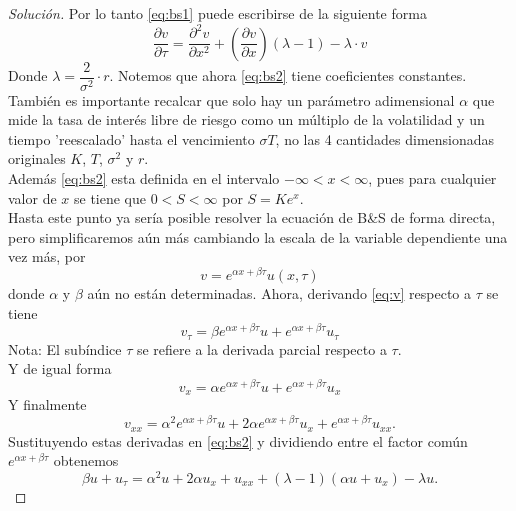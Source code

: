 \documentclass[11pt,notitlepage]{article}
\newenvironment{solucion}
  {\begin{proof}[Solución]}
  {\end{proof}}
\begin{document}
\begin{solucion}
    Por lo tanto \eqref{eq:bs1} puede escribirse de la siguiente forma
    \begin{equation}
        \label{eq:bs2}
        \frac{\partial v}{\partial \tau} = \frac{\partial^2 v}{\partial x^2} + \left(\frac{\partial v}{\partial x}\right) (\lambda - 1) - \lambda \cdot v
    \end{equation}
    Donde $\lambda = \dfrac{2}{\sigma^2} \cdot r$.
    Notemos que ahora \eqref{eq:bs2} tiene coeficientes constantes.
    También es importante recalcar que solo hay un parámetro adimensional $\alpha$ que mide la tasa de interés libre de riesgo como un múltiplo de la volatilidad y un tiempo 'reescalado' hasta el vencimiento $\sigma T$, no las 4 cantidades dimensionadas originales $K$, $T$, $\sigma ^2$ y $r$.\\
    Además \eqref{eq:bs2} esta definida en el intervalo $ -\infty < x < \infty$, pues para cualquier valor de $x$ se tiene que $ 0 < S < \infty$ por $ S = Ke^x $.\\
    Hasta este punto ya sería posible resolver la ecuación de B\&S de forma directa, pero simplificaremos aún más cambiando la escala de la variable dependiente una vez más, por
    \begin{equation}
        \label{eq:v}
        v = e^{\alpha x + \beta \tau} u(x,\tau)
    \end{equation}
    donde $\alpha$ y $\beta$ aún no están determinadas. Ahora, derivando \eqref{eq:v} respecto a $\tau$ se tiene
    \begin{equation}
        \label{eq:dvt}
        v_\tau = \beta e^{\alpha x + \beta \tau} u + e^{\alpha x + \beta \tau} u_\tau
    \end{equation}
    {Nota:} El subíndice $\tau$ se refiere a la derivada parcial respecto a $\tau$.\\
    Y de igual forma
    \begin{equation}
        \label{eq:dvx}
        v_x = \alpha e^{\alpha x + \beta \tau} u + e^{\alpha x + \beta \tau} u_x
    \end{equation}
    Y finalmente
    \begin{equation}
        \label{eq:ddvx}
        v_{xx} = \alpha^2 e^{\alpha x + \beta \tau} u + 2 \alpha e^{\alpha x + \beta \tau} u_x + e^{\alpha x + \beta \tau} u_{xx}.
    \end{equation}
    Sustituyendo estas derivadas en \eqref{eq:bs2} y dividiendo entre el factor común $e^{\alpha x + \beta \tau}$ obtenemos
    \begin{equation*}
        \beta u + u_\tau = \alpha^2 u + 2 \alpha u_x + u_{xx} + (\lambda - 1)(\alpha u + u_x) - \lambda u.

\end{equation*}
\end{solucion}
\end{document}
